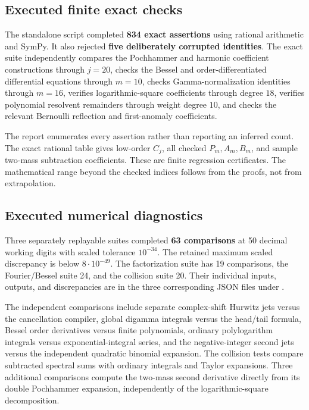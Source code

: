 \subsection{Executed finite exact checks}
The standalone script  completed
\textbf{834 exact assertions} using rational arithmetic and SymPy.
It also rejected \textbf{five deliberately corrupted identities}.
The exact suite independently compares the Pochhammer and harmonic
coefficient constructions through $j=20$, checks the Bessel and
order-differentiated differential equations through $m=10$, checks
Gamma-normalization identities through $m=16$, verifies logarithmic-square
coefficients through degree $18$, verifies polynomial resolvent
remainders through weight degree $10$, and checks the relevant
Bernoulli reflection and first-anomaly coefficients.

The report  enumerates every assertion
rather than reporting an inferred count. The exact rational table
 gives low-order $C_j$, all checked
$P_m,A_m,B_m$, and sample two-mass subtraction coefficients. These are
finite regression certificates. The mathematical range beyond the
checked indices follows from the proofs, not from extrapolation.

\subsection{Executed numerical diagnostics}
Three separately replayable suites completed \textbf{63 comparisons}
at 50 decimal working digits with scaled tolerance $10^{-34}$.
The retained maximum scaled discrepancy is below $8\cdot10^{-49}$.
The factorization suite has 19 comparisons, the Fourier/Bessel suite
24, and the collision suite 20. Their individual inputs, outputs,
and discrepancies are in the three corresponding JSON files under
.

The independent comparisons include separate complex-shift Hurwitz
jets versus the cancellation compiler, global digamma integrals
versus the head/tail formula, Bessel order derivatives versus finite
polynomials, ordinary polylogarithm integrals versus exponential-integral
series, and the negative-integer second jets versus the independent
quadratic binomial expansion. The collision tests compare subtracted
spectral sums with ordinary integrals and Taylor expansions. Three
additional comparisons compute the two-mass second derivative directly
from its double Pochhammer expansion, independently of the
logarithmic-square decomposition.

